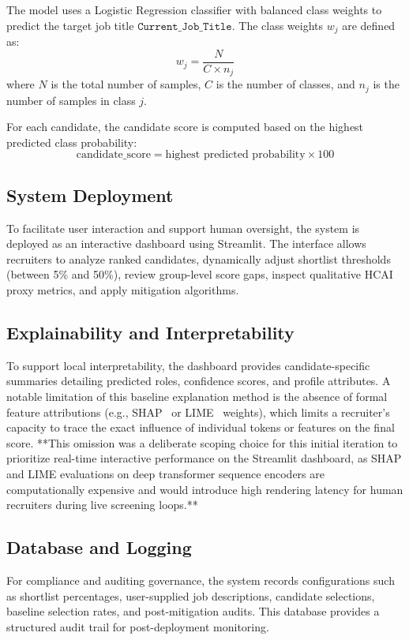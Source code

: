 \documentclass[sigconf]{acmart}
\begin{document}
The model uses a Logistic Regression classifier with balanced class weights to predict the target job title $\texttt{Current\_Job\_Title}$. The class weights $w_j$ are defined as:
\begin{equation}
w_j = \frac{N}{C \times n_j}
\end{equation}
where $N$ is the total number of samples, $C$ is the number of classes, and $n_j$ is the number of samples in class $j$.

For each candidate, the candidate score is computed based on the highest predicted class probability:
\begin{equation}
\text{candidate\_score} = \text{highest predicted probability} \times 100
\end{equation}

\subsection{System Deployment}
To facilitate user interaction and support human oversight, the system is deployed as an interactive dashboard using Streamlit. The interface allows recruiters to analyze ranked candidates, dynamically adjust shortlist thresholds (between 5\% and 50\%), review group-level score gaps, inspect qualitative HCAI proxy metrics, and apply mitigation algorithms.

\subsection{Explainability and Interpretability}
To support local interpretability, the dashboard provides candidate-specific summaries detailing predicted roles, confidence scores, and profile attributes. A notable limitation of this baseline explanation method is the absence of formal feature attributions (e.g., SHAP~\cite{lundberg2017} or LIME~\cite{ribeiro2016} weights), which limits a recruiter's capacity to trace the exact influence of individual tokens or features on the final score. **This omission was a deliberate scoping choice for this initial iteration to prioritize real-time interactive performance on the Streamlit dashboard, as SHAP and LIME evaluations on deep transformer sequence encoders are computationally expensive and would introduce high rendering latency for human recruiters during live screening loops.**

\subsection{Database and Logging}
For compliance and auditing governance, the system records configurations such as shortlist percentages, user-supplied job descriptions, candidate selections, baseline selection rates, and post-mitigation audits. This database provides a structured audit trail for post-deployment monitoring.
\end{document}
